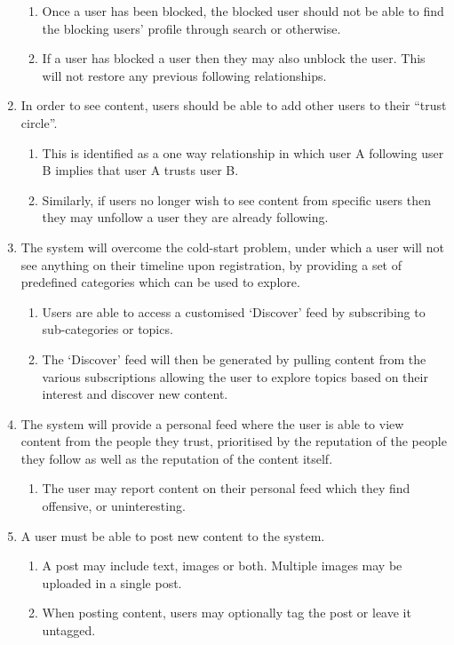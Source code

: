 \begin{enumerate}[label=\textbf{F\arabic*}]
\begin{enumerate}
			\item Once a user has been blocked, the blocked user should not be able to find the blocking users' profile through search or otherwise.
			\item If a user has blocked a user then they may also unblock the user. This will not restore any previous following relationships.
		\end{enumerate}
	\item In order to see content, users should be able to add other users to their ``trust circle''.
		\begin{enumerate}
			\item This is identified as a one way relationship in which user A following user B implies that user A trusts user B.
			\item Similarly, if users no longer wish to see content from specific users then they may unfollow a user they are already following.
		\end{enumerate}
	\item The system will overcome the cold-start problem, under which a user will not see anything on their timeline upon registration, by providing a set of predefined categories which can be used to explore.
		\begin{enumerate}
			\item Users are able to access a customised `Discover' feed by subscribing to sub-categories or topics.
			\item The `Discover' feed will then be generated by pulling content from the various subscriptions allowing the user to explore topics based on their interest and discover new content.
		\end{enumerate}
	\item The system will provide a personal feed where the user is able to view content from the people they trust, prioritised by the reputation of the people they follow as well as the reputation of the content itself.
		\begin{enumerate}
			\item The user may report content on their personal feed which they find offensive, or uninteresting.
		\end{enumerate}
	\item A user must be able to post new content to the system.
		\begin{enumerate}
			\item A post may include text, images or both. Multiple images may be uploaded in a single post.
			\item When posting content, users may optionally tag the post or leave it untagged.

\end{enumerate}
\end{enumerate}
